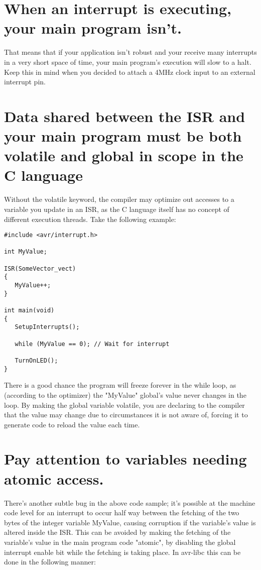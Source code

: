 \documentclass[a4paper,oneside,notitlepage]{book}
\begin{document}
\section{When an interrupt is executing, your main program isn't.}
That means that if your application isn't robust and your receive many interrupts in a very short space of time, your main program's execution will slow to a halt. Keep this in mind when you decided to attach a 4MHz clock input to an external interrupt pin.

\section{Data shared between the ISR and your main program must be both volatile and global in scope in the C language}
Without the volatile keyword, the compiler may optimize out accesses to a variable you update in an ISR, as the C language itself has no concept of different execution threads. Take the following example:

\begin{center}
\begin{lstlisting}
#include <avr/interrupt.h>

int MyValue;

ISR(SomeVector_vect)
{
   MyValue++;
}

int main(void)
{
   SetupInterrupts();

   while (MyValue == 0); // Wait for interrupt

   TurnOnLED();
}
\end{lstlisting}
\end{center}

There is a good chance the program will freeze forever in the while loop, as (according to the optimizer) the "MyValue" global's value never changes in the loop. By making the global variable volatile, you are declaring to the compiler that the value may change due to circumstances it is not aware of, forcing it to generate code to reload the value each time.

\section{Pay attention to variables needing atomic access.}
There's another subtle bug in the above code sample; it's possible at the machine code level for an interrupt to occur half way between the fetching of the two bytes of the integer variable MyValue, causing corruption if the variable's value is altered inside the ISR. This can be avoided by making the fetching of the variable's value in the main program code "atomic", by disabling the global interrupt enable bit while the fetching is taking place. In avr-libc this can be done in the following manner:
\end{document}
